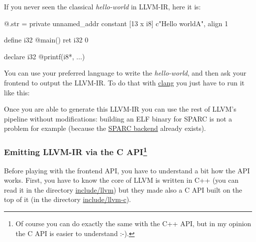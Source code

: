\documentclass[a4paper, 11pt, notitlepage]{report}
\begin{document}
If you never seen the classical \textit{hello-world} in LLVM-IR, here it is:
\begin{consolecode}
@.str = private unnamed_addr constant [13 x i8] c"Hello world\0A", align 1

define i32 @main() {
  ret i32 0
}

declare i32 @printf(i8*, ...)
\end{consolecode}
You can use your preferred language to write the \textit{hello-world}, and then ask your frontend to output the LLVM-IR. To do that with \href{http://clang.llvm.org/}{clang} you just have to run it like this:

Once you are able to generate this LLVM-IR you can use the rest of LLVM's pipeline without modifications: building an ELF binary for SPARC is not a problem for example (because the \href{https://llvm.org/viewvc/llvm-project/llvm/trunk/lib/Target/Sparc/}{SPARC backend} already exists).
\subsubsection[Emitting LLVM-IR via the C API]{Emitting LLVM-IR via the C API\protect\footnote{Of course you can do exactly the same with the C++ API, but in my opinion the C API is easier to understand :-).}}
Before playing with the frontend API, you have to understand a bit how the API works. First, you have to know the core of LLVM is written in C++ (you can read it in the directory \href{https://llvm.org/viewvc/llvm-project/llvm/trunk/include/llvm/}{include/llvm}) but they made also a C API built on the top of it (in the directory \href{https://llvm.org/viewvc/llvm-project/llvm/trunk/include/llvm-c/}{include/llvm-c}).
\end{document}
